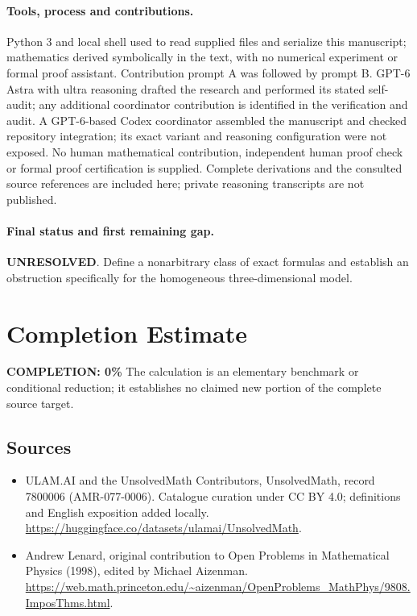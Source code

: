 \documentclass[11pt]{article}
\begin{document}
\paragraph{Tools, process and contributions.}
Python 3 and local shell used to read supplied files and serialize this manuscript; mathematics derived symbolically in the text, with no numerical experiment or formal proof assistant. Contribution prompt A was followed by prompt B. GPT-6 Astra with ultra reasoning drafted the research and performed its stated self-audit; any additional coordinator contribution is identified in the verification and audit. A GPT-6-based Codex coordinator assembled the manuscript and checked repository integration; its exact variant and reasoning configuration were not exposed. No human mathematical contribution, independent human proof check or formal proof certification is supplied. Complete derivations and the consulted source references are included here; private reasoning transcripts are not published.

\paragraph{Final status and first remaining gap.}
\textbf{UNRESOLVED}. Define a nonarbitrary class of exact formulas and establish an obstruction specifically for the homogeneous three-dimensional model.

\section{Completion Estimate}
\noindent\textbf{COMPLETION: 0\%}
The calculation is an elementary benchmark or conditional reduction; it establishes no claimed new portion of the complete source target.

\subsection{Sources}
\begin{itemize}
\item[\hypertarget{source:7800006:1}{S1}] ULAM.AI and the UnsolvedMath Contributors, UnsolvedMath, record 7800006 (AMR-077-0006). Catalogue curation under CC BY 4.0; definitions and English exposition added locally.
\url{https://huggingface.co/datasets/ulamai/UnsolvedMath}.
\item[\hypertarget{source:7800006:2}{S2}] Andrew Lenard, original contribution to Open Problems in Mathematical Physics (1998), edited by Michael Aizenman.
\url{https://web.math.princeton.edu/~aizenman/OpenProblems_MathPhys/9808.ImposThms.html}.
\end{itemize}
\label{end:7800006}
\end{document}
